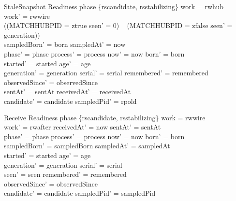 \documentclass[a4paper,10pt,fleqn]{article}
\begin{document}
\begin{schema}{StaleSnapshot}
  \Delta Readiness
\where
  phase \in \{rscandidate, rsstabilizing\} \land work = rwhub \\
  work' = rwwire \\
  ((MATCHHUBPID = ztrue \land seen' = 0) \lor
  \quad~ (MATCHHUBPID = zfalse \land seen' = generation)) \\
  sampledBorn' = born \land sampledAt' = now \\
  phase' = phase \land process' = process \land now' = now \land born' = born \\
  started' = started \land age' = age \\
  generation' = generation \land serial' = serial \land remembered' = remembered \\
  observedSince' = observedSince \\
  sentAt' = sentAt \land receivedAt' = receivedAt \\
  candidate' = candidate \land sampledPid' = rpold
\end{schema}
\begin{schema}{Receive}
  \Delta Readiness
\where
  phase \in \{rscandidate, rsstabilizing\} \land work = rwwire \\
  work' = rwafter \land receivedAt' = now \land sentAt' = sentAt \\
  phase' = phase \land process' = process \land now' = now \land born' = born \\
  sampledBorn' = sampledBorn \land sampledAt' = sampledAt \\
  started' = started \land age' = age \\
  generation' = generation \land serial' = serial \\
  seen' = seen \land remembered' = remembered \\
  observedSince' = observedSince \\
  candidate' = candidate \land sampledPid' = sampledPid
\end{schema}
\end{document}

